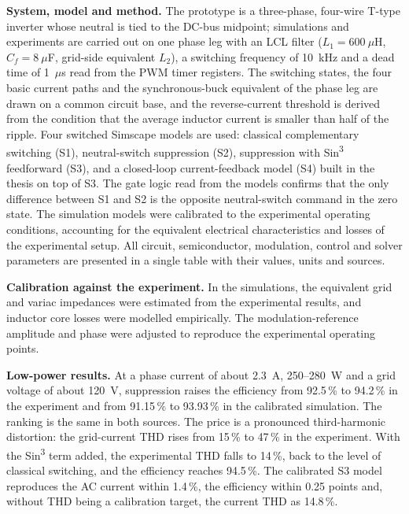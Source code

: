 \begin{summary}
\textbf{System, model and method.} The prototype is a three-phase, four-wire T-type inverter whose neutral is tied to the DC-bus midpoint; simulations and experiments are carried out on one phase leg with an LCL filter ($L_1=600~\mu$H, $C_f=8~\mu$F, grid-side equivalent $L_2$), a switching frequency of 10~kHz and a dead time of 1~$\mu$s read from the PWM timer registers. The switching states, the four basic current paths and the synchronous-buck equivalent of the phase leg are drawn on a common circuit base, and the reverse-current threshold is derived from the condition that the average inductor current is smaller than half of the ripple. Four switched Simscape models are used: classical complementary switching (S1), neutral-switch suppression (S2), suppression with Sin\textsuperscript{3} feedforward (S3), and a closed-loop current-feedback model (S4) built in the thesis on top of S3. The gate logic read from the models confirms that the only difference between S1 and S2 is the opposite neutral-switch command in the zero state. The simulation models were calibrated to the experimental operating conditions, accounting for the equivalent electrical characteristics and losses of the experimental setup. All circuit, semiconductor, modulation, control and solver parameters are presented in a single table with their values, units and sources.

\textbf{Calibration against the experiment.} In the simulations, the equivalent grid and variac impedances were estimated from the experimental results, and inductor core losses were modelled empirically. The modulation-reference amplitude and phase were adjusted to reproduce the experimental operating points.

\textbf{Low-power results.} At a phase current of about 2.3~A, 250--280~W and a grid voltage of about 120~V, suppression raises the efficiency from 92.5\,\% to 94.2\,\% in the experiment and from 91.15\,\% to 93.93\,\% in the calibrated simulation. The ranking is the same in both sources. The price is a pronounced third-harmonic distortion: the grid-current THD rises from 15\,\% to 47\,\% in the experiment. With the Sin\textsuperscript{3} term added, the experimental THD falls to 14\,\%, back to the level of classical switching, and the efficiency reaches 94.5\,\%. The calibrated S3 model reproduces the AC current within 1.4\,\%, the efficiency within 0.25 points and, without THD being a calibration target, the current THD as 14.8\,\%.


\end{summary}
